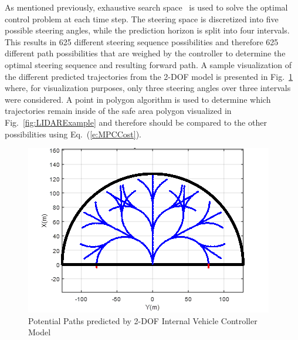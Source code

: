 \documentclass[12pt,onecolumn]{report}
\begin{document}
As mentioned previously, exhaustive search space~\cite{ModelFidelity2016} is used to solve the optimal control problem at each time step. The steering space is discretized into five possible steering angles, while the prediction horizon is split into four intervals. This results in 625 different steering sequence possibilities and therefore 625 different path possibilities that are weighed by the controller to determine the optimal steering sequence and resulting forward path. A sample visualization of the different predicted trajectories from the 2-DOF model is presented in Fig.~\ref{fig:PossiblePaths} where, for visualization purposes, only three steering angles over three intervals were considered. A point in polygon algorithm is used to determine which trajectories remain inside of the safe area polygon visualized in Fig.~\ref{fig:LIDARExample} and therefore should be compared to the other possibilities using Eq.~(\ref{e:MPCCost}).

\begin{figure}
	\centering
	\includegraphics[width=\columnwidth]{Figs/PathPossibilities.png}
	\caption{\small Potential Paths predicted by 2-DOF Internal Vehicle Controller Model}  
	\label{fig:PossiblePaths}
\end{figure}
 
\end{document}

